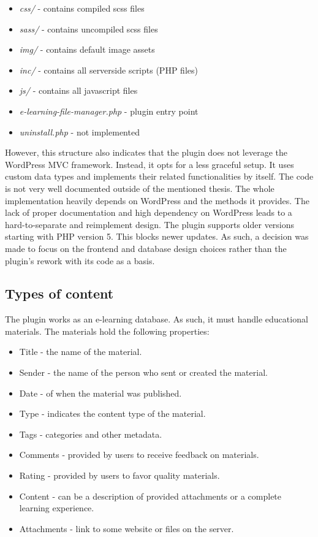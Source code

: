 \documentclass[
  digital,     %
  oneside,     %
  nosansbold,  %
  colorbold, %
  lof,         %
  lot,         %
]{fithesis4}
\begin{document}
\begin{itemize}
	\item \textit{css/} - contains compiled scss files
	\item \textit{sass/} - contains uncompiled scss files
	\item \textit{img/} - contains default image assets
	\item \textit{inc/} - contains all serverside scripts (PHP files)
	\item \textit{js/} - contains all javascript files
	\item \textit{e-learning-file-manager.php} - plugin entry point
	\item \textit{uninstall.php} - not implemented
\end{itemize}

However, this structure also indicates that the plugin does not leverage the WordPress MVC framework. Instead, it opts for a less graceful setup. It uses custom data types and implements their related functionalities by itself. The code is not very well documented outside of the mentioned thesis. The whole implementation heavily depends on WordPress and the methods it provides. The lack of proper documentation and high dependency on WordPress leads to a hard-to-separate and reimplement design. The plugin supports older versions starting with PHP version 5. This blocks newer updates. As such, a decision was made to focus on the frontend and database design choices rather than the plugin's rework with its code as a basis.

\subsection{Types of content}

The plugin works as an e-learning database. As such, it must handle educational materials. The materials hold the following properties:

\begin{itemize}
	\item Title - the name of the material.
	\item Sender - the name of the person who sent or created the material.
	\item Date - of when the material was published.
	\item Type - indicates the content type of the material.
	\item Tags - categories and other metadata.
	\item Comments - provided by users to receive feedback on materials.
	\item Rating - provided by users to favor quality materials.
	\item Content - can be a description of provided attachments or a complete learning experience.
	\item Attachments - link to some website or files on the server.
\end{itemize}
\end{document}
